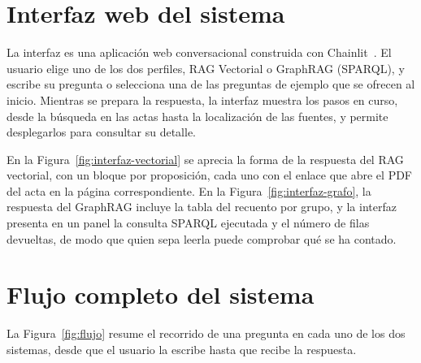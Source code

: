 \documentclass[11pt, a4paper]{report}
\begin{document}
	\section{Interfaz web del sistema}

	La interfaz es una aplicación web conversacional construida con Chainlit~\cite{chainlit}. El
	usuario elige uno de los dos perfiles, RAG Vectorial o GraphRAG (SPARQL), y escribe su pregunta o selecciona una de las preguntas de ejemplo
	que se ofrecen al inicio. Mientras se prepara la respuesta, la interfaz
	muestra los pasos en curso, desde la búsqueda en las actas hasta la localización de las fuentes, y permite desplegarlos para consultar su
	detalle.

	En la Figura~\ref{fig:interfaz-vectorial} se aprecia la forma de la respuesta
	del RAG vectorial, con un bloque por proposición, cada uno con el enlace
	que abre el PDF del acta en la página correspondiente. En la
	Figura~\ref{fig:interfaz-grafo}, la respuesta del GraphRAG incluye la tabla
	del recuento por grupo, y la interfaz presenta en un panel la consulta SPARQL
	ejecutada y el número de filas devueltas, de modo que quien sepa leerla puede
	comprobar qué se ha contado.

	\section{Flujo completo del sistema}

	La Figura~\ref{fig:flujo} resume el recorrido de una pregunta en cada uno de
	los dos sistemas, desde que el usuario la escribe hasta que recibe la
	respuesta.
\end{document}
